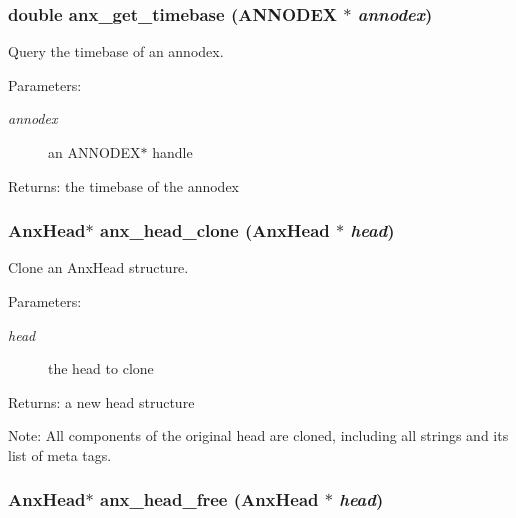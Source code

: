 \subsubsection{\setlength{\rightskip}{0pt plus 5cm}double anx\_\-get\_\-timebase ({\bf ANNODEX} $\ast$ {\em annodex})}\label{anx__general_8h_a15}


Query the timebase of an annodex. 

\begin{Desc}
\item[Parameters:]
\begin{description}
\item[{\em annodex}]an ANNODEX$\ast$ handle \end{description}
\end{Desc}
\begin{Desc}
\item[Returns:]the timebase of the annodex \end{Desc}
\subsubsection{\setlength{\rightskip}{0pt plus 5cm}Anx\-Head$\ast$ anx\_\-head\_\-clone (Anx\-Head $\ast$ {\em head})}\label{anx__general_8h_a23}


Clone an Anx\-Head structure. 

\begin{Desc}
\item[Parameters:]
\begin{description}
\item[{\em head}]the head to clone \end{description}
\end{Desc}
\begin{Desc}
\item[Returns:]a new head structure \end{Desc}
\begin{Desc}
\item[Note:]All components of the original head are cloned, including all strings and its list of meta tags. \end{Desc}
\subsubsection{\setlength{\rightskip}{0pt plus 5cm}Anx\-Head$\ast$ anx\_\-head\_\-free (Anx\-Head $\ast$ {\em head})}\label{anx__general_8h_a21}


